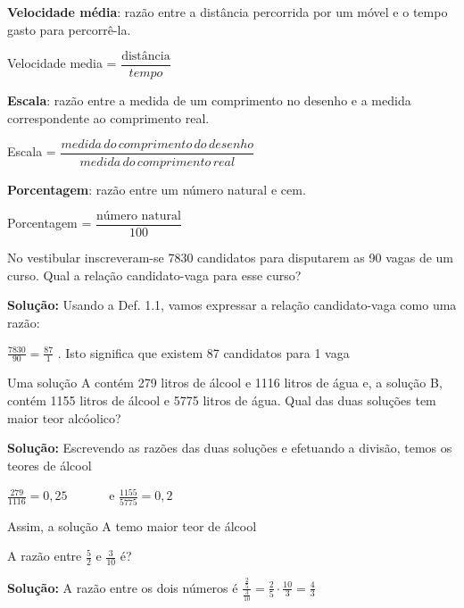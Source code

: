 \textbf{Velocidade média}: razão entre a distância percorrida por um móvel e o tempo gasto para percorrê-la.
\begin{caixa}
	Velocidade media = $\dfrac{\textrm{distância}}{tempo}$
\end{caixa}

\textbf{Escala}: razão entre a medida de um comprimento no desenho e a medida correspondente ao comprimento real.
\begin{caixa}
	Escala = $\dfrac{medida\,do\,comprimento\,do\,desenho}{medida\,do\,comprimento\,real}$
\end{caixa}

\textbf{Porcentagem}: razão entre um número natural e cem.
\begin{caixa}
	Porcentagem = $\dfrac{\textrm{número natural}}{100}$
\end{caixa}

\begin{texemplo}
	No vestibular inscreveram-se 7830 candidatos para disputarem as 90 vagas de um curso. Qual a relação candidato-vaga para esse curso?

	\textbf{Solução: }Usando a Def. 1.1, vamos expressar a relação candidato-vaga como uma razão:

	\( \frac{7830}{90}=\frac{87}{1} \)  . Isto significa que existem 87 candidatos para 1 vaga \qedsymbol{}
\end{texemplo}
\begin{texemplo}
	Uma solução A contém 279 litros de álcool e 1116 litros de água e, a solução B, contém 1155 litros de álcool e 5775 litros de água. Qual das duas soluções tem maior teor alcóolico?

	\textbf{Solução: }Escrevendo as razões das duas soluções e efetuando a divisão, temos os teores de álcool

	\( \frac{279}{1116}=0,25 \) \ \ \ \ \ \  \quad e \quad \quad   \( \frac{1155}{5775}=0,2 \) 

	Assim, a solução A temo maior teor de álcool \qedsymbol{}
\end{texemplo}
\begin{texemplo}
	A razão entre $\frac{5}{2}$ e $\frac{3}{10}$ é?

\textbf{Solução:} A razão entre os dois números é \( \frac{\frac{2}{5}}{\frac{3}{10}}=\frac{2}{5} \cdot \frac{10}{3}=\frac{4}{3} \) \qedsymbol{}

\end{texemplo}

